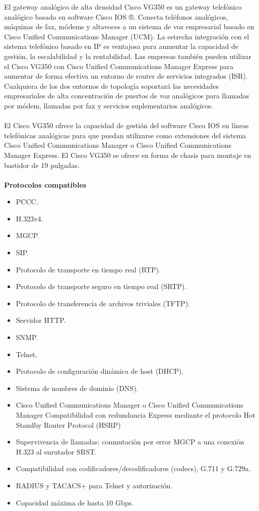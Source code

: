 \documentclass[12pt,letterpaper]{article}
\begin{document}
El gateway analógico de alta densidad Cisco VG350 es un gateway telefónico analógico 
basado en software Cisco IOS ®. Conecta teléfonos analógicos, máquinas de fax, módems y 
altavoces a un sistema de voz empresarial basado en Cisco Unified Communications Manager 
(UCM). La estrecha integración con el sistema telefónico basado en IP es ventajosa para 
aumentar la capacidad de gestión, la escalabilidad y la rentabilidad. Las empresas también 
pueden utilizar el Cisco VG350 con Cisco Unified Communications Manager Express para 
aumentar de forma efectiva un entorno de router de servicios integrados (ISR). 
Cualquiera de los dos entornos de topología soportará las necesidades empresariales de 
alta concentración de puertos de voz analógicos para llamadas por módem, llamadas por 
fax y servicios suplementarios analógicos.
\\ \\
El Cisco VG350 ofrece la capacidad de gestión del software Cisco IOS en líneas telefónicas 
analógicas para que puedan utilizarse como extensiones del sistema Cisco Unified 
Communications Manager o Cisco Unified Communications Manager Express. El Cisco VG350 
se ofrece en forma de chasis para montaje en bastidor de 19 pulgadas. \cite{gateways}
\\ \\
\textbf{Protocolos compatibles}
\begin{itemize} 
    \item PCCC.
    \item H.323v4.
    \item MGCP.
    \item SIP.
    \item Protocolo de transporte en tiempo real (RTP).
    \item Protocolo de transporte seguro en tiempo real (SRTP).
    \item Protocolo de transferencia de archivos triviales (TFTP).
    \item Servidor HTTP.
    \item SNMP.
    \item Telnet.
    \item Protocolo de configuración dinámica de host (DHCP).
    \item Sistema de nombres de dominio (DNS).
    \item Cisco Unified Communications Manager o Cisco Unified 
    Communications Manager Compatibilidad con redundancia Express 
    mediante el protocolo Hot Standby Router Protocol (HSRP)
    \item Supervivencia de llamadas: conmutación por error MGCP 
    a una conexión H.323 al enrutador SRST.
    \item Compatibilidad con codificadores/decodificadores (codecs), G.711 y G.729a.
    \item RADIUS y TACACS+ para Telnet y autorización.
    \item Copacidad máxima de hasta 10 Gbps.
\end{itemize}
\end{document}

